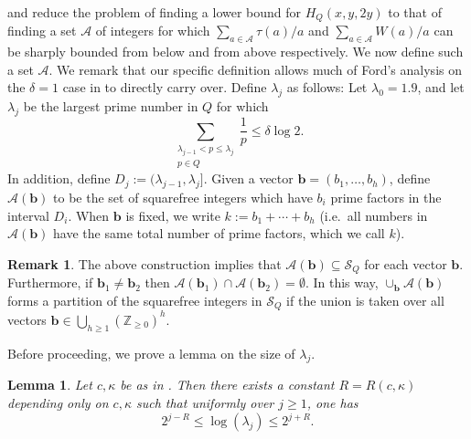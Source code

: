 \documentclass{amsart}
\newtheorem{lemma}[theorem]{Lemma}
\theoremstyle{definition}
\newtheorem*{remark}{Remark}
\numberwithin{equation}{section}
\renewcommand{\S}{\mathcal{S}}
\newcommand{\density}{\delta}
\begin{document}
	 and  reduce the problem of finding a lower bound for $H_Q(x,y,2y)$ to that of finding a set $\mathscr{A}$ of integers for which $\sum_{a \in \mathscr{A}} \tau(a)/a$ and $\sum_{a \in \mathscr{A}} W(a)/a$ can be sharply bounded from below and from above respectively. We now define such a set $\mathscr{A}$. We remark that our specific definition allows much of Ford's analysis on the $\delta = 1$ case in \cite{ford2008distribution} to directly carry over. Define $\lambda_j$ as follows: Let $\lambda_0 = 1.9$, and let $\lambda_j$ be the largest prime number in $Q$ for which
	\begin{equation}\label{define lambda}
		\sum_{\substack{\lambda_{j-1}< p \leq \lambda_j \\ p \in Q}} \frac{1}{p} \leq \density \log 2.
	\end{equation}
	In addition, define $D_j := (\lambda_{j-1},\lambda_j]$. Given a vector $\bm{b} = (b_1,\dots, b_h)$, define $\mathscr{A}(\bm{b})$ to be the set of squarefree integers which have $b_i$ prime factors in the interval $D_i$. When $\bm{b}$ is fixed, we write $k := b_1 + \cdots +b_h$ (i.e.~all numbers in $\mathscr{A}(\bm{b})$ have the same total number of prime factors, which we call $k$). 
	\begin{remark}
		The above construction implies that $\mathscr{A}(\bm{b}) \subseteq \S_Q$ for each vector $\bm{b}$. Furthermore, if $\bm{b}_1 \ne \bm{b}_2$ then $\mathscr{A}(\bm{b}_1) \cap \mathscr{A}(\bm{b}_2) = \emptyset$. In this way, $\cup_{\bm{b}} \mathscr{A}(\bm{b})$ forms a partition of the squarefree integers in $\S_Q$ if the union is taken over all vectors $\bm{b} \in \bigcup_{h \geq 1}(\mathbb{Z}_{\geq 0})^h$.
	\end{remark}
	Before proceeding, we prove a lemma on the size of $\lambda_j$.
	\begin{lemma}\label{lem: size of lambda}
		Let $c,\kappa$ be as in . Then there exists a constant $R =R(c,\kappa)$ depending only on $c,\kappa$ such that uniformly over $j \geq 1$, one has
		$$2^{j-R} \leq \log(\lambda_j) \leq 2^{j+R}.$$
	\end{lemma}
\end{document}
